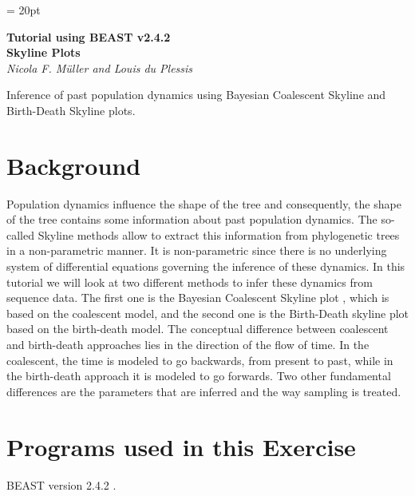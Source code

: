 \documentclass[11pt]{article}
\begin{document}
\renewcommand{\headrulewidth}{0.5pt}
\headsep = 20pt
\lhead{ }

\thispagestyle{plain}

\begin{center}
\textbf{\LARGE Tutorial using BEAST v2.4.2}\\\vspace{2mm}
\textbf{\textcolor{mycol}{\Large Skyline Plots}}\\
\vspace{4mm}
{\Large {\em Nicola F. Müller and Louis du Plessis}}
\end{center}


Inference of past population dynamics using Bayesian Coalescent Skyline and Birth-Death Skyline plots.

\bigskip
\section{Background}

Population dynamics influence the shape of the tree and consequently, the shape of the tree contains some information about past population dynamics. The so-called Skyline methods allow to extract this information from phylogenetic trees in a non-parametric manner. It is non-parametric since there is no underlying system of differential equations governing the inference of these dynamics. In this tutorial we will look at two different methods to infer these dynamics from sequence data. The first one is the Bayesian Coalescent Skyline plot \citep{Drummond2005}, which is based on the coalescent model, and the second one is the Birth-Death skyline \citep{Stadler2013} plot based on the birth-death model. The conceptual difference between coalescent and birth-death approaches lies in the direction of the flow of time. In the coalescent, the time is modeled to go backwards, from present to past, while in the birth-death approach it is modeled to go forwards. Two other fundamental differences are the parameters that are inferred and the way sampling is treated. 


\bigskip
\section{Programs used in this Exercise}\label{programsSec}


BEAST version 2.4.2 \citep{Bouckaert2014}. 
\end{document}
